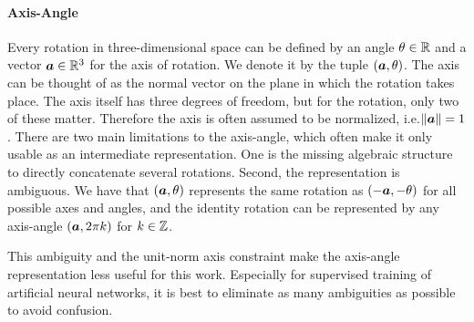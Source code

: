 		\paragraph{Axis-Angle}
		Every rotation in three-dimensional space can be defined by an angle 
		$\theta \in \mathbb{R}$ and a vector 
		$\bm{a} \in \mathbb{R}^3$ for the axis of rotation.
		We denote it by the tuple $(\bm{a}, \theta)$.
		The axis can be thought of as the normal vector on the plane in which the rotation takes place.
		The axis itself has three degrees of freedom, but for the rotation, only two of these matter.
		Therefore the axis is often assumed to be normalized, i.e.\@ $\lVert \bm{a} \rVert = 1$.
		There are two main limitations to the axis-angle, which often make it only usable as an intermediate representation.
		One is the missing algebraic structure to directly concatenate several rotations.
		Second, the representation is ambiguous.
		We have that $(\bm{a}, \theta)$ represents the same rotation as $(-\bm{a}, -\theta)$ for all possible axes and angles, and the identity rotation can be represented by any axis-angle $(\bm{a}, 2 \pi k)$ for $k \in \mathbb{Z}$.
		
		This ambiguity and the unit-norm axis constraint make the axis-angle representation less useful for this work.
		Especially for supervised training of artificial neural networks, it is best to eliminate as many ambiguities as possible to avoid confusion.
		
